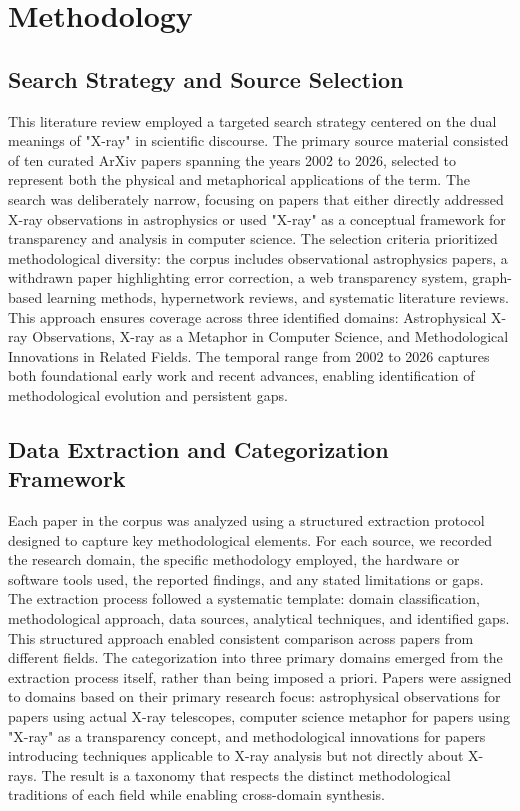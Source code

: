 \documentclass[conference]{IEEEtran}
\begin{document}
\section{Methodology}

\subsection{Search Strategy and Source Selection}

This literature review employed a targeted search strategy centered on the dual meanings of "X-ray" in scientific discourse. The primary source material consisted of ten curated ArXiv papers spanning the years 2002 to 2026, selected to represent both the physical and metaphorical applications of the term. The search was deliberately narrow, focusing on papers that either directly addressed X-ray observations in astrophysics or used "X-ray" as a conceptual framework for transparency and analysis in computer science. The selection criteria prioritized methodological diversity: the corpus includes observational astrophysics papers, a withdrawn paper highlighting error correction, a web transparency system, graph-based learning methods, hypernetwork reviews, and systematic literature reviews. This approach ensures coverage across three identified domains: Astrophysical X-ray Observations, X-ray as a Metaphor in Computer Science, and Methodological Innovations in Related Fields. The temporal range from 2002 to 2026 captures both foundational early work and recent advances, enabling identification of methodological evolution and persistent gaps.

\subsection{Data Extraction and Categorization Framework}

Each paper in the corpus was analyzed using a structured extraction protocol designed to capture key methodological elements. For each source, we recorded the research domain, the specific methodology employed, the hardware or software tools used, the reported findings, and any stated limitations or gaps. The extraction process followed a systematic template: domain classification, methodological approach, data sources, analytical techniques, and identified gaps. This structured approach enabled consistent comparison across papers from different fields. The categorization into three primary domains emerged from the extraction process itself, rather than being imposed a priori. Papers were assigned to domains based on their primary research focus: astrophysical observations for papers using actual X-ray telescopes, computer science metaphor for papers using "X-ray" as a transparency concept, and methodological innovations for papers introducing techniques applicable to X-ray analysis but not directly about X-rays. The result is a taxonomy that respects the distinct methodological traditions of each field while enabling cross-domain synthesis.
\end{document}
